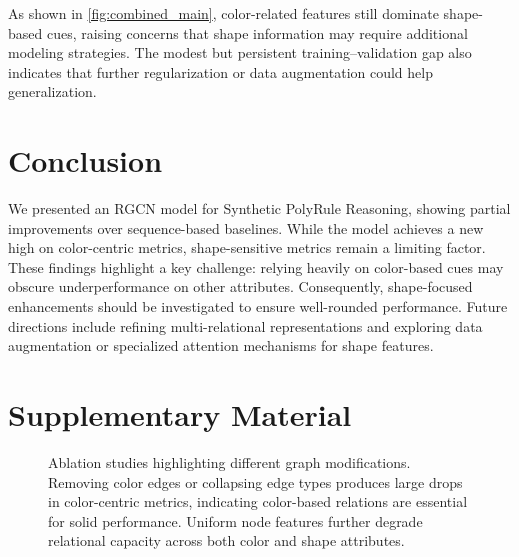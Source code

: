 \documentclass{article} %
\theoremstyle{plain}
\theoremstyle{definition}
\theoremstyle{remark}
\begin{document}
As shown in \cref{fig:combined_main}, color-related features still dominate shape-based cues, raising concerns that shape information may require additional modeling strategies. The modest but persistent training--validation gap also indicates that further regularization or data augmentation could help generalization.

\section{Conclusion}
We presented an RGCN model for Synthetic PolyRule Reasoning, showing partial improvements over sequence-based baselines. While the model achieves a new high on color-centric metrics, shape-sensitive metrics remain a limiting factor. These findings highlight a key challenge: relying heavily on color-based cues may obscure underperformance on other attributes. Consequently, shape-focused enhancements should be investigated to ensure well-rounded performance. Future directions include refining multi-relational representations and exploring data augmentation or specialized attention mechanisms for shape features.




\appendix

\section*{\LARGE Supplementary Material}
\label{sec:appendix}
\begin{figure}[h]
\centering
{}
\caption{Ablation studies highlighting different graph modifications. Removing color edges or collapsing edge types produces large drops in color-centric metrics, indicating color-based relations are essential for solid performance. Uniform node features further degrade relational capacity across both color and shape attributes.}
\label{fig:ablation}
\end{figure}
\end{document}
